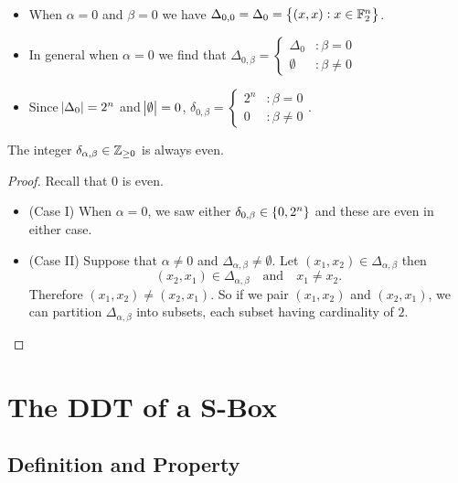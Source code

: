 \documentclass[11pt,openany]{article}
\begin{document}
\begin{remark}
\ \begin{itemize}
	\item When $\alpha=0$ and $\beta=0$ we have
	$\Delta_{0,0}=\Delta_0=\set{(x,x):x\in\mathbb{F}_2^n}$.
	\item In general when $\alpha=0$ we find that
	$\Delta_{0,\beta}=\begin{cases}
		\Delta_0 &:\beta=0\\
		\emptyset &:\beta\neq 0
	\end{cases}$
	\item  Since $\abs{\Delta_0}=2^n$ and $\abs{\emptyset}=0$,\quad
	$\delta_{0,\beta}=\begin{cases}
		2^n &:\beta=0 \\
		0 &:\beta\neq 0
	\end{cases}$.
\end{itemize}
\end{remark}

\begin{probox}{}
	\begin{proposition}
		The integer $\delta_{\alpha,\beta}\in\mathbb{Z}_{\geq 0}$ is always even.
	\end{proposition}
\end{probox}
\begin{proof}
	Recall that $0$ is even.
	\begin{itemize}
		\item[] (Case I) When $\alpha=0$, we saw either $\delta_{0,\beta}\in\set{0,2^n}$ and these are even in either case.
		\item[] (Case II) Suppose that $\alpha\neq 0$ and $\Delta_{\alpha,\beta}\neq\emptyset$. Let $(x_1,x_2)\in\Delta_{\alpha,\beta}$ then \[
		(x_2,x_1)\in\Delta_{\alpha,\beta}\quad\text{and}\quad x_1\neq x_2.
		\] Therefore $(x_1,x_2)\neq(x_2,x_1)$. So if we pair $(x_1,x_2)$ and $(x_2,x_1)$, we can partition $\Delta_{\alpha,\beta}$ into subsets, each subset having cardinality of $2$.
	\end{itemize}
\end{proof}

\section{The DDT of a S-Box}
\subsection{Definition and Property}
\end{document}
